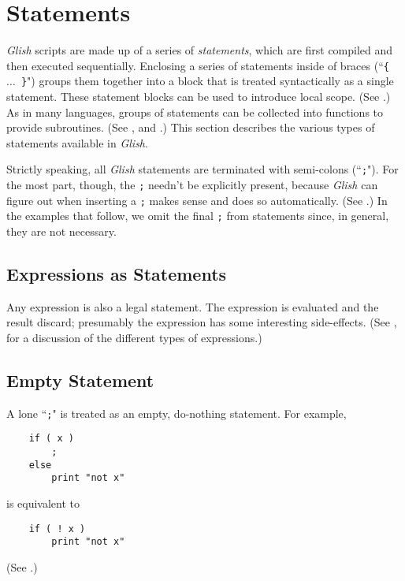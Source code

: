 
\chapter{Statements}
\label{statements}

{\em Glish} scripts are made up of a series of {\em statements\/}, which are
first compiled and then executed sequentially.  Enclosing a series of
\label{statement-block}
statements inside of braces (``{\tt \{ $\ldots$ \}}") groups them together
into a block that is treated syntactically as a single statement. These
statement blocks can be used to introduce local scope. (See .)
As in many languages, groups of statements can be collected into functions
to provide subroutines. (See  , and .)
This section describes the various types of statements available
in {\em Glish}.

Strictly speaking, all {\em Glish} statements are terminated with semi-colons
(``{\tt ;}").  For the most part, though, the {\tt ;} needn't be explicitly
present, because {\em Glish} can figure out when inserting a {\tt ;} makes sense
and does so automatically.  (See .)  In the
examples that follow, we omit the final {\tt ;} from statements since, in
general, they are not necessary.

\section{Expressions as Statements}
\label{expr-statement}

Any expression is also a legal statement.  The expression is evaluated
and the result discard; presumably the expression has some interesting
side-effects.  (See , for a discussion of the
different types of expressions.)

\section{Empty Statement}
\label{empty-statement}

A lone ``{\tt ;}" is treated as an empty, do-nothing statement.  For
example,
\begin{verbatim}
    if ( x )
        ;
    else
        print "not x"
\end{verbatim}
is equivalent to
\begin{verbatim}
    if ( ! x )
        print "not x"
\end{verbatim}
(See .)

